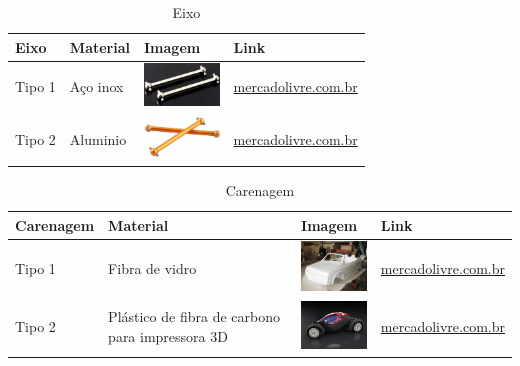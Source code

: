   \begin{table}[!htbp]
  \begin{center}
  \caption{Eixo}
  \begin{tabular}{|p{2cm}|p{3cm}|p{2cm}|p{4cm}|}
  \hline
  \textbf{Eixo} & \textbf{Material} & \textbf{Imagem} & \textbf{Link}\\\hline\hline
  Tipo 1 & Aço inox & \includegraphics[width=2cm]{figuras/eixo_inox.jpg} & \href{http://produto.mercadolivre.com.br/MLB-681527051-par-de-eixo-dogbone-84-mm-06061-redcat-himoto-exceed-hsp-_JM}{mercadolivre.com.br}\\\hline
  Tipo 2 & Aluminio  & \includegraphics[width=2cm]{figuras/eixo_aluminio.jpg} & \href{http://produto.mercadolivre.com.br/MLB-700430643-eixos-dogbones-em-aluminio-mastadon-spino-himoto-23608-par-_JM}{mercadolivre.com.br}\\\hline
  \end{tabular}
  \end{center}
  \end{table}

  \begin{table}[!htbp]
  \begin{center}
  \caption{Carenagem}
  \begin{tabular}{|p{3cm}|p{3cm}|p{2cm}|p{4cm}|}
  \hline
  \textbf{Carenagem} & \textbf{Material} & \textbf{Imagem} & \textbf{Link}\\\hline\hline
  Tipo 1 & Fibra de vidro & \includegraphics[width=2cm]{figuras/carenagem_fibra.jpg} & \href{http://produto.mercadolivre.com.br/MLB-712761072-kit-resina-500g-manta-fibra-de-vidro-300g-10g-catalizador-_JM}{mercadolivre.com.br}\\\hline
  Tipo 2 & Plástico de fibra de carbono para impressora 3D & \includegraphics[width=2cm]{figuras/carenagem_plastico.jpg} & \href{http://produto.mercadolivre.com.br/MLB-704169297-envelopamento-fibra-carbono-teto-ou-capo-1x122-_JM}{mercadolivre.com.br}\\\hline
  \end{tabular}
  \end{center}
  \end{table}

